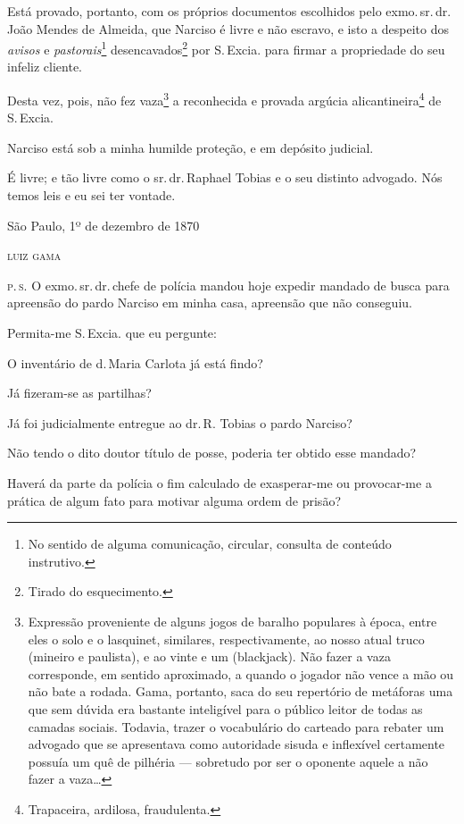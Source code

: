 Está provado, portanto, com os próprios documentos escolhidos pelo exmo.\,sr.\,dr.\,João Mendes de Almeida, que Narciso é livre e não escravo, e
isto a despeito dos \emph{avisos} e \emph{pastorais}\footnote{ No
  sentido de alguma comunicação, circular, consulta de conteúdo
  instrutivo.} desencavados\footnote{ Tirado do esquecimento.} por
S.\,Excia. para firmar a propriedade do seu infeliz cliente.

Desta vez, pois, não fez vaza\footnote{ Expressão proveniente de
  alguns jogos de baralho populares à época, entre eles o solo e o
  lasquinet, similares, respectivamente, ao nosso atual truco (mineiro e
  paulista), e ao vinte e um (blackjack). Não fazer a vaza corresponde,
  em sentido aproximado, a quando o jogador não vence a mão ou não bate
  a rodada. Gama, portanto, saca do seu repertório de metáforas uma que
  sem dúvida era bastante inteligível para o público leitor de todas as
  camadas sociais. Todavia, trazer o vocabulário do carteado para
  rebater um advogado que se apresentava como autoridade sisuda e
  inflexível certamente possuía um quê de pilhéria --- sobretudo por ser
  o oponente aquele a não fazer a vaza\ldots{}} a reconhecida e provada
argúcia alicantineira\footnote{ Trapaceira, ardilosa, fraudulenta.}
de S.\,Excia.

Narciso está sob a minha humilde proteção, e em depósito judicial.

É livre; e tão livre como o sr.\,dr.\,Raphael Tobias e o seu distinto
advogado. Nós temos leis e eu sei ter vontade.

\begin{flushright}
São Paulo, 1º de dezembro de 1870

\textsc{luiz gama}
\end{flushright}

\textsc{p.\,s.} O exmo.\,sr.\,dr.\,chefe de polícia mandou hoje expedir mandado de
busca para apreensão do pardo Narciso em minha casa, apreensão que não
conseguiu.

Permita-me S.\,Excia. que eu pergunte:

O inventário de d.\,Maria Carlota já está findo?

Já fizeram-se as partilhas?

Já foi judicialmente entregue ao dr.\,R. Tobias o pardo Narciso?

Não tendo o dito doutor título de posse, poderia ter obtido esse
mandado?

Haverá da parte da polícia o fim calculado de exasperar-me ou
provocar-me a prática de algum fato para motivar alguma ordem de prisão?

